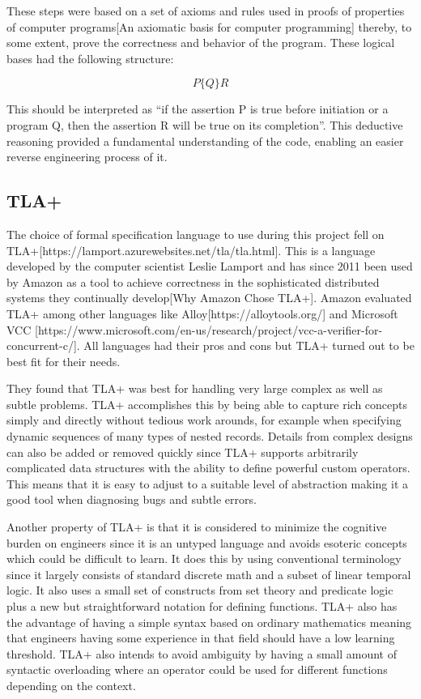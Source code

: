 \documentclass{article}
\begin{document}
These steps were based on a set of axioms and rules used in proofs of properties of computer programs[An axiomatic basis for computer programming] thereby, to some extent, prove the correctness and behavior of the program. These logical bases had the following structure:

\begin{displaymath}
                    P\{Q\}R   
\end{displaymath}
                        
This should be interpreted as “if the assertion P is true before initiation or a program Q, then the assertion R will be true on its completion”. This deductive reasoning provided a fundamental understanding of the code, enabling an easier reverse engineering process of it. 

\subsection{TLA+}\label{tla}

The choice of formal specification language to use during this project fell on TLA+[https://lamport.azurewebsites.net/tla/tla.html]. This is a language developed by the computer scientist Leslie Lamport and has since 2011 been used by Amazon as a tool to achieve correctness in the sophisticated distributed systems they continually develop[Why Amazon Chose TLA+]. Amazon evaluated TLA+ among other languages like Alloy[https://alloytools.org/] and Microsoft VCC [https://www.microsoft.com/en-us/research/project/vcc-a-verifier-for-concurrent-c/]. All languages had their pros and cons but TLA+ turned out to be best fit for their needs.

They found that TLA+ was best for handling very large complex as well as subtle problems. TLA+ accomplishes this by being able to capture rich concepts simply and directly without tedious work arounds, for example when specifying dynamic sequences of many types of nested records. Details from complex designs can also be added or removed quickly since TLA+ supports arbitrarily complicated data structures with the ability to define powerful custom operators. This means that it is easy to adjust to a suitable level of abstraction making it a good tool when diagnosing bugs and subtle errors.

Another property of TLA+ is that it is considered to minimize the cognitive burden on engineers since it is an untyped language and avoids esoteric concepts which could be difficult to learn. It does this by using conventional terminology since it largely consists of standard discrete math and a subset of linear temporal logic. It also uses a small set of constructs from set theory and predicate logic plus a new but straightforward notation for defining functions. TLA+ also has the advantage of having a simple syntax based on ordinary mathematics meaning that engineers having some experience in that field should have a low learning threshold. TLA+ also intends to avoid ambiguity by having a small amount of syntactic overloading where an operator could be used for different functions depending on the context.
\end{document}
